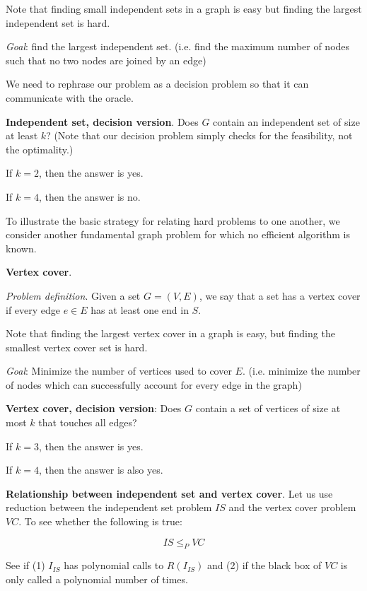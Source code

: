 \documentclass{article}
\begin{document}
Note that finding small independent sets in a graph is easy but finding the largest independent set is hard.

\textit{Goal}: find the largest independent set. (i.e. find the maximum number of nodes such that no two nodes are joined by an edge)

We need to rephrase our problem as a decision problem so that it can communicate with the oracle.

\textbf{Independent set, decision version}. Does $G$ contain an independent set of size at least $k$? (Note that our decision problem simply checks for the feasibility, not the optimality.)

If $k = 2$, then the answer is yes.

If $k = 4$, then the answer is no.

To illustrate the basic strategy for relating hard problems to one another, we consider another fundamental graph problem for which no efficient algorithm is known.

\textbf{Vertex cover}.

\textit{Problem definition}. Given a set $G = (V, E)$, we say that a set has a vertex cover if every edge $e \in E$ has at least one end in $S$.

Note that finding the largest vertex cover in a graph is easy, but finding the smallest vertex cover set is hard.

\textit{Goal}: Minimize the number of vertices used to cover $E$. (i.e. minimize the number of nodes which can successfully account for every edge in the graph)

\textbf{Vertex cover, decision version}: Does $G$ contain a set of vertices of size at most $k$ that touches all edges?

If $k = 3$, then the answer is yes.

If $k = 4$, then the answer is also yes.%

\textbf{Relationship between independent set and vertex cover}.
Let us use reduction between the independent set problem $IS$ and the vertex cover problem $VC$. To see whether the following is true:

$$IS \leq_{P} VC$$

See if (1) $I_{IS}$ has polynomial calls to $R(I_{IS})$ and (2) if the black box of $VC$ is only called a polynomial number of times.

\end{document}
